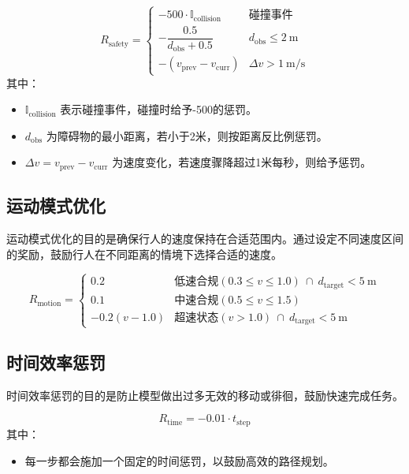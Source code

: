 \begin{equation}
R_{\text{safety}} =
\begin{cases}
-500 \cdot \mathbb{I}_{\text{collision}} & \text{碰撞事件} \\
-\dfrac{0.5}{d_{\text{obs}} + 0.5} & d_{\text{obs}} \leq 2\ \text{m} \\
-(v_{\text{prev}} - v_{\text{curr}}) & \Delta v > 1\ \text{m/s}
\end{cases}
\end{equation}
其中：
\begin{itemize}
    \item \( \mathbb{I}_{\text{collision}} \) 表示碰撞事件，碰撞时给予-500的惩罚。
    \item \( d_{\text{obs}} \) 为障碍物的最小距离，若小于2米，则按距离反比例惩罚。
    \item \( \Delta v = v_{\text{prev}} - v_{\text{curr}} \) 为速度变化，若速度骤降超过1米每秒，则给予惩罚。
\end{itemize}

\subsection{运动模式优化}
运动模式优化的目的是确保行人的速度保持在合适范围内。通过设定不同速度区间的奖励，鼓励行人在不同距离的情境下选择合适的速度。

\begin{equation}
R_{\text{motion}} =
\begin{cases}
0.2 & \text{低速合规}(0.3 \leq v \leq 1.0)\ \cap\ d_{\text{target}} < 5\ \text{m} \\
0.1 & \text{中速合规}(0.5 \leq v \leq 1.5) \\
-0.2(v-1.0) & \text{超速状态}(v > 1.0)\ \cap\ d_{\text{target}} < 5\ \text{m}
\end{cases}
\end{equation}

\subsection{时间效率惩罚}
时间效率惩罚的目的是防止模型做出过多无效的移动或徘徊，鼓励快速完成任务。

\begin{equation}
R_{\text{time}} = -0.01 \cdot t_{\text{step}}
\end{equation}
其中：
\begin{itemize}
    \item 每一步都会施加一个固定的时间惩罚，以鼓励高效的路径规划。
\end{itemize}

